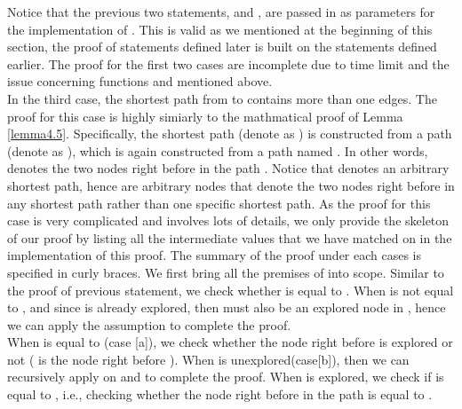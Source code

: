 Notice that the previous two statements,  and , are passed in as parameters for the implementation of . This is valid as we mentioned at the beginning of this section, the proof of statements defined later is built on the statements defined earlier. The proof for the first two cases are incomplete due to time limit and the issue concerning functions  and  mentioned above. 
\\

In the third case, the shortest path from  to  contains more than one edges. The proof for this case is highly simiarly to the mathmatical proof of Lemma \ref{lemma4.5}. Specifically, the shortest  path (denote as ) is constructed from a  path (denote as ), which is again constructed from a  path named . In other words,  denotes the two nodes right before  in the path . Notice that  denotes an arbitrary shortest  path, hence  are arbitrary nodes that denote the two nodes right before  in any shortest  path rather than one specific shortest path. As the proof for this case is very complicated and involves lots of details, we only provide the skeleton of our proof by listing all the intermediate values that we have matched on in the implementation of this proof. The summary of the proof under each cases is specified in curly braces. We first bring all the premises of  into scope. Similar to the proof of previous statement, we check whether  is equal to . When  is not equal to , and since  is already explored, then  must also be an explored node in , hence we can apply the  assumption to complete the proof. 
\\

When  is equal to (case [a]), we check whether the node  right before  is explored or not ( is the node right before ). When  is unexplored(case[b]), then we can recursively apply  on  and  to complete the proof. When  is explored, we check if  is equal to , i.e., checking whether the node right before  in the path  is equal to . 
\\

